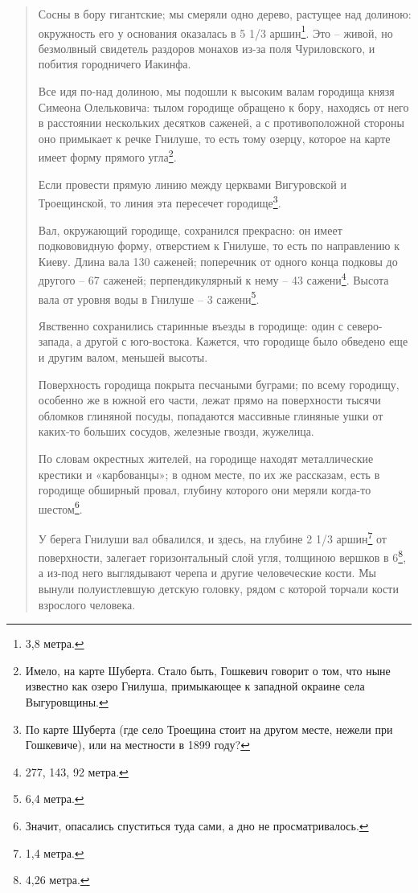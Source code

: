 \begin{quotation}
Сосны в бору гигантские; мы смеряли одно дерево, растущее над долиною: окружность его у основания оказалась в 5 1/3 аршин\footnote{3,8 метра.}. Это – живой, но безмолвный свидетель раздоров монахов из-за поля Чуриловского, и побития городничего Иакинфа.

Все идя по-над долиною, мы подошли к высоким валам городища князя Симеона Олельковича: тылом городище обращено к бору, находясь от него в расстоянии нескольких десятков саженей, а с противоположной стороны оно примыкает к речке Гнилуше, то есть тому озерцу, которое на карте имеет форму прямого угла\footnote{Имело, на карте Шуберта. Стало быть, Гошкевич говорит о том, что ныне известно как озеро Гнилуша, примыкающее к западной окраине села Выгуровщины.}.

Если провести прямую линию между церквами Вигуровской и Троещинской, то линия эта пересечет городище\footnote{По карте Шуберта (где село Троещина стоит на другом месте, нежели при Гошкевиче), или на местности в 1899 году?}.

Вал, окружающий городище, сохранился прекрасно: он имеет подкововидную форму, отверстием к Гнилуше, то есть по направлению к Киеву. Длина вала 130 саженей; поперечник от одного конца подковы до другого – 67 саженей; перпендикулярный к нему – 43 сажени\footnote{277,  143, 92 метра.}. Высота вала от уровня воды в Гнилуше – 3 сажени\footnote{6,4 метра.}.

Явственно сохранились старинные въезды в городище: один с северо-запада, а другой с юго-востока. Кажется, что городище было обведено еще и другим валом, меньшей высоты.

Поверхность городища покрыта песчаными буграми; по всему городищу, особенно же в южной его части, лежат прямо на поверхности тысячи обломков глиняной посуды, попадаются массивные глиняные ушки от каких-то больших сосудов, железные гвозди, жужелица.

По словам окрестных жителей, на городище находят металлические крестики и «карбованцы»; в одном месте, по их же рассказам, есть в городище обширный провал, глубину которого они меряли когда-то шестом\footnote{Значит, опасались спуститься туда сами, а дно не просматривалось.}.

У берега Гнилуши вал обвалился, и здесь, на глубине 2 1/3 аршин\footnote{1,4 метра.} от поверхности, залегает горизонтальный слой угля, толщиною вершков в 6\footnote{4,26 метра.}, а из-под него выглядывают черепа и другие человеческие кости. Мы вынули полуистлевшую детскую головку, рядом с которой торчали кости взрослого человека.


\end{quotation}
